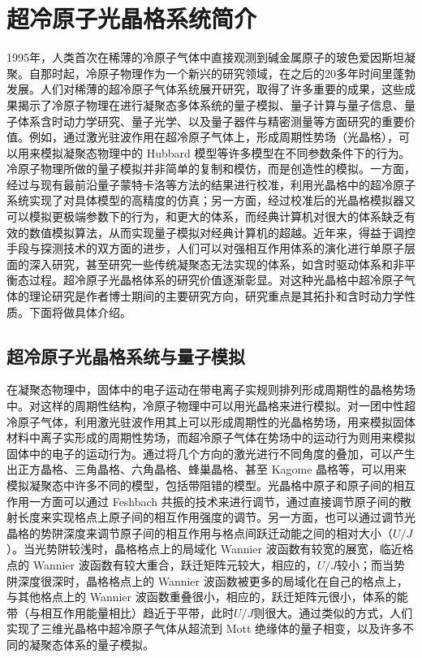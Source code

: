 \chapter{超冷原子光晶格系统简介}
\label{cha:intro}

1995年，人类首次在稀薄的冷原子气体中直接观测到碱金属原子的玻色爱因斯坦凝聚\cite{bec1995a,bec1995b}。自那时起，冷原子物理作为一个新兴的研究领域，在之后的20多年时间里蓬勃发展。人们对稀薄的超冷原子气体系统展开研究，取得了许多重要的成果，这些成果揭示了冷原子物理在进行凝聚态多体系统的量子模拟、量子计算与量子信息、量子体系含时动力学研究、量子光学、以及量子器件与精密测量等方面研究的重要价值\cite{bloch2012}。例如，通过激光驻波作用在超冷原子气体上，形成周期性势场（光晶格），可以用来模拟凝聚态物理中的 Hubbard 模型等许多模型在不同参数条件下的行为。冷原子物理所做的量子模拟并非简单的复制和模仿，而是创造性的模拟。一方面，经过与现有最前沿量子蒙特卡洛等方法的结果进行校准，利用光晶格中的超冷原子系统实现了对具体模型的高精度的仿真；另一方面，经过校准后的光晶格模拟器又可以模拟更极端参数下的行为，和更大的体系，而经典计算机对很大的体系缺乏有效的数值模拟算法，从而实现量子模拟对经典计算机的超越\cite{feynman1982,qsgoals2012}。近年来，得益于调控手段与探测技术的双方面的进步，人们可以对强相互作用体系的演化进行单原子层面的深入研究，甚至研究一些传统凝聚态无法实现的体系，如含时驱动体系和非平衡态过程。超冷原子光晶格体系的研究价值逐渐彰显。对这种光晶格中超冷原子气体的理论研究是作者博士期间的主要研究方向，研究重点是其拓扑和含时动力学性质。下面将做具体介绍。


\section{超冷原子光晶格系统与量子模拟}

在凝聚态物理中，固体中的电子运动在带电离子实规则排列形成周期性的晶格势场中。对这样的周期性结构，冷原子物理中可以用光晶格来进行模拟。对一团中性超冷原子气体，利用激光驻波作用其上可以形成周期性的光晶格势场，用来模拟固体材料中离子实形成的周期性势场，而超冷原子气体在势场中的运动行为则用来模拟固体中的电子的运动行为。通过将几个方向的激光进行不同角度的叠加，可以产生出正方晶格、三角晶格、六角晶格、蜂巢晶格、甚至 Kagome 晶格等，可以用来模拟凝聚态中许多不同的模型，包括带阻错的模型。光晶格中原子和原子间的相互作用一方面可以通过 Feshbach 共振的技术来进行调节\cite{feshbach2010}，通过直接调节原子间的散射长度来实现格点上原子间的相互作用强度的调节。另一方面，也可以通过调节光晶格的势阱深度来调节原子间的相互作用与格点间跃迁动能之间的相对大小（$U/J$）\cite{bloch2012}。当光势阱较浅时，晶格格点上的局域化 Wannier 波函数有较宽的展宽，临近格点的 Wannier 波函数有较大重合，跃迁矩阵元较大，相应的，$U/J$较小；而当势阱深度很深时，晶格格点上的 Wannier 波函数被更多的局域化在自己的格点上，与其他格点上的 Wannier 波函数重叠很小，相应的，跃迁矩阵元很小，体系的能带（与相互作用能量相比）趋近于平带，此时$U/J$则很大。通过类似的方式，人们实现了三维光晶格中超冷原子气体从超流到 Mott 绝缘体的量子相变\cite{mott-sf-2002}，以及许多不同的凝聚态体系的量子模拟。

